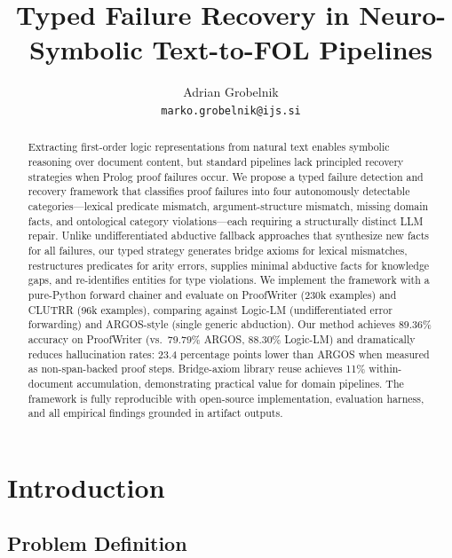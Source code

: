 \documentclass[11pt,letterpaper]{article}
\title{\textbf{Typed Failure Recovery in Neuro-Symbolic Text-to-FOL Pipelines}}
\author{
  Adrian Grobelnik \\
  \texttt{marko.grobelnik@ijs.si}
}
\date{}
\begin{document}
\maketitle

\begin{abstract}
Extracting first-order logic representations from natural text enables symbolic reasoning over document content, but standard pipelines lack principled recovery strategies when Prolog proof failures occur. We propose a typed failure detection and recovery framework that classifies proof failures into four autonomously detectable categories---lexical predicate mismatch, argument-structure mismatch, missing domain facts, and ontological category violations---each requiring a structurally distinct LLM repair. Unlike undifferentiated abductive fallback approaches that synthesize new facts for all failures, our typed strategy generates bridge axioms for lexical mismatches, restructures predicates for arity errors, supplies minimal abductive facts for knowledge gaps, and re-identifies entities for type violations. We implement the framework with a pure-Python forward chainer and evaluate on ProofWriter (230k examples) and CLUTRR (96k examples), comparing against Logic-LM (undifferentiated error forwarding) and ARGOS-style (single generic abduction). Our method achieves 89.36\% accuracy on ProofWriter (vs.\ 79.79\% ARGOS, 88.30\% Logic-LM) and dramatically reduces hallucination rates: 23.4 percentage points lower than ARGOS when measured as non-span-backed proof steps. Bridge-axiom library reuse achieves 11\% within-document accumulation, demonstrating practical value for domain pipelines. The framework is fully reproducible with open-source implementation, evaluation harness, and all empirical findings grounded in artifact outputs.
\end{abstract}

\section{Introduction}

\subsection{Problem Definition}
\end{document}
